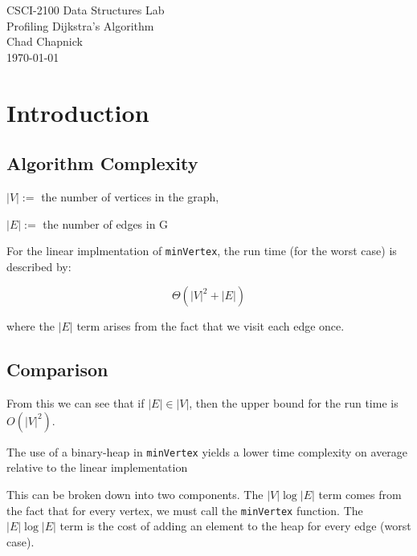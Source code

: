 \documentclass[technote]{IEEEtran}
\begin{document}
\begin{titlepage}
    \vspace*{\fill}
    \begin{center}
        {\Huge CSCI-2100 Data Structures Lab}\\[0.3cm]
        {\huge Profiling Dijkstra's Algorithm}\\[0.6cm]
        {\Large Chad Chapnick}\\[0.4cm]
        {\small\today}
    \end{center}
    \vspace*{\fill}
\end{titlepage}
\section{Introduction}

\subsection{Algorithm Complexity}

$|V| :=$ the number of vertices in the graph,  

$|E| :=$ the number of edges in G

For the linear implmentation of \texttt{minVertex}, the run time (for the worst case) 
is described by:

$$\Theta(|V|^2 + |E|)$$

where the $|E|$ term arises from the fact that we visit each edge once.

\subsection{Comparison}

From this we can see that if $|E| \in |V|$, 
then the upper bound for the run time is $O(|V|^2)$.


The use of a binary-heap in \texttt{minVertex} yields a 
lower time complexity on average relative to the linear implementation




This can be broken down into two components. 
The $|V|\log|E|$ term comes from the fact that for every vertex, 
we must call the \texttt{minVertex} function.
The $|E|\log|E|$ term is the cost of adding an element to the 
heap for every edge (worst case).
\end{document}
